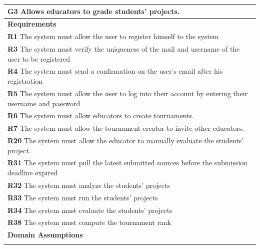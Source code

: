 \begin{table}[H]
    \begin{tabularx}{\textwidth}{X}
        \toprule
        \textbf{G3} Allows educators to grade students' projects.                                                    \\ \midrule
        \textbf{Requirements}                                                                                                        \\ \midrule
        \textbf{R1} The system must allow the user to register himself to the system                                                     \\
        \textbf{R3} The system must verify the uniqueness of the mail and username of the user to be registered                                       \\ 
        \textbf{R4} The system must send a confirmation on the user's email after his registration                         \\
        \textbf{R5} The system must allow the user to log into their account by entering their username and password           \\
        \textbf{R6} The system must allow educators to create tournaments.              \\
        \textbf{R7} The system must allow the tournament creator to invite other educators.         \\  
        \textbf{R20} The system must allow the educator to manually evaluate the students' project.          \\ 
        \textbf{R31} The system must pull the latest submitted sources before the submission deadline expired     \\ 
        \textbf{R32} The system must analyze the students' projects      \\ 
        \textbf{R33} The system must run the students' projects      \\
        \textbf{R34} The system must evaluate the students' projects     \\ 
        \textbf{R38} The system must compute the tournament rank                 \\ 
        \midrule


        \textbf{Domain Assumptions}                                                                                                  \\ \midrule
                                                        \\ \bottomrule
    \end{tabularx}
\end{table}

